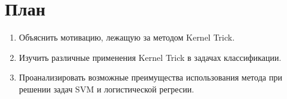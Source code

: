 \section{План}
\begin{enumerate}
  \item Объяснить мотивацию, лежащую за методом Kernel Trick.
  \item Изучить различные применения Kernel Trick в задачах классификации.
  \item Проанализировать возможные преимущества использования метода при решении задач SVM и логистической регресии.
\end{enumerate}